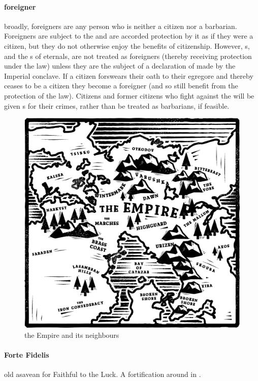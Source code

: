 \paragraph{foreigner} broadly, foreigners are any person who is neither a citizen nor a barbarian. Foreigners are subject to the  and are accorded protection by it as if they were a citizen, but they do not otherwise enjoy the benefits of citizenship. However, s, and the s of eternals, are not treated as foreigners (thereby receiving protection under the law) unless they are the subject of a declaration of  made by the Imperial conclave. If a citizen forswears their oath to their egregore and thereby ceases to be a citizen they become a foreigner (and so still benefit from the protection of the law). Citizens and former citizens who fight against the  will be given s for their crimes, rather than be treated as barbarians, if feasible. \begin{figure}\centering\includegraphics[width=1.1\textwidth,trim={0.7cm 0.7cm 0.7cm 0.7cm},clip]{encyclopedia/worldmap}\caption{the Empire and its neighbours}\end{figure}
\paragraph{Forte Fidelis} old asavean for Faithful to the Luck. A fortification around  in .
